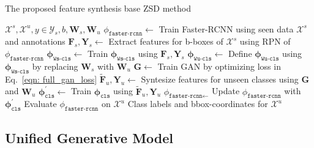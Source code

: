 \documentclass[runningheads]{llncs}
\begin{document}
\begin{algorithm*}[!t]
  \caption{The proposed  feature synthesis base ZSD method}
  \label{alg}
  \begin{algorithmic}[1]
  \Require $\mathcal{X}^s,\mathcal{X}^u, y \in \mathcal{Y}_s, b, \mathbf{W}_s, \mathbf{W}_u$
\State $\phi_{\texttt{faster-rcnn}} \leftarrow$ Train Faster-RCNN using seen data $\mathcal{X}^s$ and annotations
\State $\mathbf{F}_s,\mathbf{Y}_s \leftarrow$ Extract features for b-boxes of $\mathcal{X}^s$ using RPN of $\phi_{\texttt{faster-rcnn}}$
\State $\mathbf{\phi}_{\texttt{Ws-cls}} \leftarrow$ Train $\mathbf{\phi}_{\texttt{Ws-cls}}$ using $\mathbf{F}_s,\mathbf{Y}_s$
\State $\mathbf{\phi}_{\texttt{Wu-cls}} \leftarrow$ Define $\mathbf{\phi}_{\texttt{Wu-cls}}$ using $\mathbf{\phi}_{\texttt{Ws-cls}}$ by replacing $\mathbf{W}_s$ with $\mathbf{W}_u$
\State $\mathbf{G}\leftarrow$ Train GAN by optimizing loss in Eq.~\ref{eqn: full_gan_loss}
\State $\mathbf{\tilde{F}}_u, \mathbf{Y}_u \leftarrow$ Syntesize features for unseen classes using $\mathbf{G}$ and $\mathbf{W}_u$
\State $\mathbf{\phi}_{\texttt{cls}}^\prime \leftarrow$ Train $\mathbf{\phi}_{\texttt{cls}}$ using $\mathbf{\tilde{F}}_u, \mathbf{Y}_u$
\State $\phi_{\texttt{faster-rcnn}\leftarrow}$ Update $\phi_{\texttt{faster-rcnn}}$ with $\mathbf{\phi}_{\texttt{cls}}^\prime$
\State Evaluate $\phi_{\texttt{faster-rcnn}}$ on $\mathcal{X}^u$
\Ensure Class labels and bbox-coordinates for $\mathcal{X}^u$
  \end{algorithmic}
  \label{alg: main}
\end{algorithm*}



\subsection{Unified Generative Model}
\end{document}

